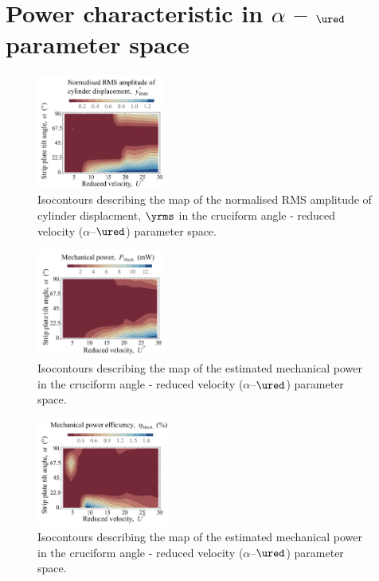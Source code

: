 \documentclass[a4paper,fleqn]{cas-sc}
\begin{document}
\section{Power characteristic in $\alpha$ -- $\ured$ parameter space}\label{sec:powerCharacteristic}

\begin{figure}
  \centering
  \includegraphics[width=0.38\textwidth]{figs/yRMSContour}
  \caption{Isocontours describing the map of the normalised RMS amplitude of cylinder displacment, $\yrms$ in the cruciform angle - reduced velocity ($\alpha$--$\ured$) parameter space.}
  \label{fig:yRMSContour}
\end{figure}

\begin{figure}
  \centering
  \includegraphics[width=0.38\textwidth]{figs/mechanicalPowerContours}
  \caption{Isocontours describing the map of the estimated mechanical power in the cruciform angle - reduced velocity ($\alpha$--$\ured$) parameter space.}
  \label{fig:mechanicalPowerContour}
\end{figure}

\begin{figure}
  \centering
  \includegraphics[width=0.39\textwidth]{figs/powerEfficiencyContours}
  \caption{Isocontours describing the map of the estimated mechanical power in the cruciform angle - reduced velocity ($\alpha$--$\ured$) parameter space.}
  \label{fig:powerEfficiencyContour}
\end{figure}
\end{document}
